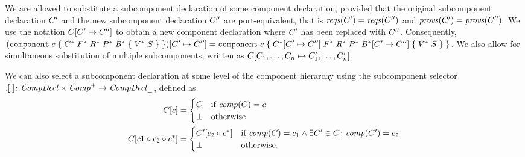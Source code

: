 \documentclass[a4paper,10pt,english]{article}
\begin{document}
We are allowed to substitute a subcomponent declaration of some component declaration, provided that
the original subcomponent declaration $C'$ and the new subcomponent declaration $C''$ are port-equivalent, that is
$\mathit{reqs}(C') = \mathit{reqs}(C'')$ and $\mathit{provs}(C') = \mathit{provs}(C'')$.
We use the notation $C[C' \mapsto C'']$ to obtain a new component declaration
where $C'$ has been replaced with $C''$. Consequently,
$(\texttt{component} \; c \; \mathtt{\{} \; C^* \; F^* \; R^* \; P^* \; \mathit{B}^* \; \mathtt{\{} \; V^* \; S \; \mathtt{\}} \; \mathtt{\}})[C'
\mapsto C''] =
\texttt{component} \; c \; \mathtt{\{} \; C^*[C'
\mapsto C''] \; F^* \; R^* \; P^* \; \mathit{B}^*[C'
\mapsto C''] \; \mathtt{\{} \; V^* \; S \; \mathtt{\}} \; \mathtt{\}}$. We also allow for simultaneous substitution of multiple subcomponents, written as
$C[C_1, \ldots, C_n \mapsto C_1', \ldots, C_n']$.

We can also select a subcomponent declaration at some level of the component hierarchy using the subcomponent selector $.[.]
\colon \mathit{CompDecl} \times \mathit{Comp}^+ \rightarrow \mathit{CompDecl}_\bot$, defined as
\begin{align*}
	C[c] &= \begin{cases}
		C & \text{if } \mathit{comp}(C) = c \\
		\bot & \text{otherwise}
	\end{cases} \\
	C[c1 \circ c_2 \circ c^*] &= 
		\begin{cases}
			C'[c_2 \circ c^*] & \text{if } 
				\mathit{comp}(C) = c_1 \wedge \exists C' \in C \colon \mathit{comp}(C') = c_2 \\
			\bot & \text{otherwise.}
		\end{cases}
\end{align*}
\end{document}
